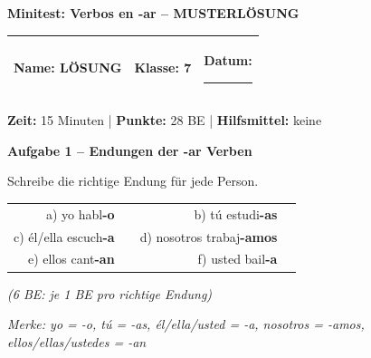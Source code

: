 \documentclass[11pt, a4paper]{article}
\newcommand{\fachfarbe}{spanisch}
\newcommand{\thema}{Minitest: Verbos en -ar -- MUSTERLÖSUNG}
\newcommand{\klasse}{7}
\newcommand{\maxpunkte}{28}
\newcommand{\zeit}{15 Minuten}
\newcommand{\punktebox}[1]{\hfill\fbox{\small \_\_\_/#1}}
\newcommand{\luecke}[1]{\rule{#1}{0.4pt}}
\newcommand{\lsg}[1]{\textcolor{loesung}{\textbf{#1}}}
\newenvironment{aufgabe}[1]{%
    \vspace{12pt}
    \noindent\textbf{\textcolor{\fachfarbe}{Aufgabe #1}}
    \vspace{6pt}
    \begin{list}{}{\leftmargin=0pt}
    \item[]
}{%
    \end{list}
}
\begin{document}

\begin{center}
    {\Large\bfseries\textcolor{loesung}{\thema}}
\end{center}

\vspace{5pt}

\noindent
\begin{tabularx}{\textwidth}{|X|X|X|}
\hline
\textbf{Name:} \lsg{LÖSUNG} &
\textbf{Klasse:} \klasse &
\textbf{Datum:} \luecke{2cm} \\
\hline
\end{tabularx}

\vspace{10pt}

\begin{infobox}
\textbf{Zeit:} \zeit{} | \textbf{Punkte:} \maxpunkte{} BE | \textbf{Hilfsmittel:} keine
\end{infobox}

\vspace{15pt}


\begin{aufgabe}{1 -- Endungen der -ar Verben}
Schreibe die richtige Endung für jede Person. \punktebox{6}
\end{aufgabe}

\noindent
\begin{tabular}{rlrl}
a) yo habl\lsg{-o} & & b) tú estudi\lsg{-as} & \\[0.8em]
c) él/ella escuch\lsg{-a} & & d) nosotros trabaj\lsg{-amos} & \\[0.8em]
e) ellos cant\lsg{-an} & & f) usted bail\lsg{-a} & \\
\end{tabular}

\textcolor{loesung}{\textit{(6 BE: je 1 BE pro richtige Endung)}}

\textcolor{loesung}{\textit{Merke: yo = -o, tú = -as, él/ella/usted = -a, nosotros = -amos, ellos/ellas/ustedes = -an}}

\vspace{15pt}

\end{document}
